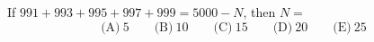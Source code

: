 If $991+993+995+997+999=5000-N$, then $N=$
\[
\text{(A)}\ 5\qquad\text{(B)}\ 10\qquad\text{(C)}\ 15\qquad\text{(D)}\ 20\qquad\text{(E)}\ 25
\]
